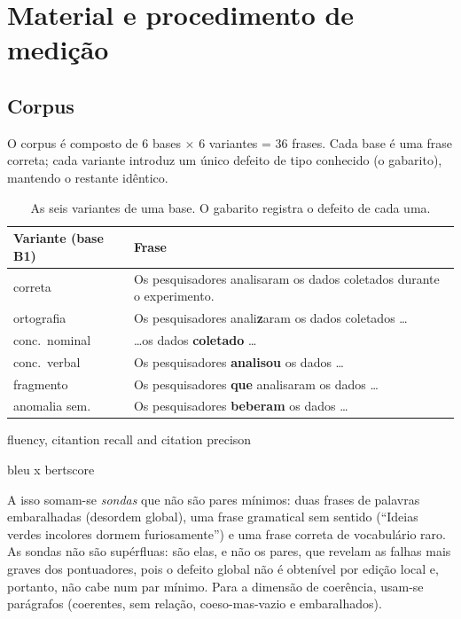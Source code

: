 \documentclass[11pt,a4paper]{article}
\newcommand{\dimtable}[1]{\small #1}
\begin{document}
\section{Material e procedimento de medição}

\subsection{Corpus}
\label{sec:corpus}

O corpus é composto de 6 bases $\times$ 6 variantes = 36 frases. Cada base é uma frase correta;
cada variante introduz um único defeito de tipo conhecido (o gabarito), mantendo o restante
idêntico.

\begin{table}[H]
\centering
\dimtable{
\begin{tabular}{@{}ll@{}}
\toprule
\textbf{Variante (base B1)} & \textbf{Frase} \\
\midrule
correta       & Os pesquisadores analisaram os dados coletados durante o experimento. \\
ortografia    & Os pesquisadores anali\textbf{z}aram os dados coletados \dots \\
conc.\ nominal& \dots os dados \textbf{coletado} \dots \\
conc.\ verbal & Os pesquisadores \textbf{analisou} os dados \dots \\
fragmento     & Os pesquisadores \textbf{que} analisaram os dados \dots \\
anomalia sem. & Os pesquisadores \textbf{beberam} os dados \dots \\
\bottomrule
\end{tabular}}
\caption{As seis variantes de uma base. O gabarito registra o defeito de cada uma.}
\label{tab:corpus}
\end{table}


\noindent fluency, citantion recall and citation precison

bleu x bertscore

\noindent A isso somam-se \emph{sondas} que não são pares mínimos: duas frases de palavras
embaralhadas (desordem global), uma frase gramatical sem sentido (``Ideias verdes incolores dormem
furiosamente'') e uma frase correta de vocabulário raro. As sondas não são supérfluas: são elas, e
não os pares, que revelam as falhas mais graves dos pontuadores, pois o defeito global não é
obtenível por edição local e, portanto, não cabe num par mínimo. Para a dimensão de coerência,
usam-se parágrafos (coerentes, sem relação, coeso-mas-vazio e embaralhados).
\end{document}
